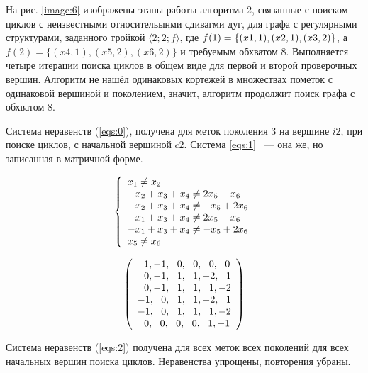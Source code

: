 \documentclass[14pt]{mmcs-article}
\begin{document}
На рис. \ref{image:6} изображены этапы работы алгоритма 2, связанные с поиском циклов с неизвестными относительынми сдивагми дуг, для графа с регулярными структурами, заданного тройкой $ \langle 2; 2; f\rangle $, где $ f(1) = \{ (x1, 1),\\ (x2, 1), (x3, 2) \} $, а $f(2) = \{ (x4, 1), (x5, 2), (x6, 2) \}$ и требуемым обхватом 8. Выполняется четыре итерации поиска циклов в общем виде для первой и второй проверочных вершин. Алгоритм не нашёл одинаковых кортежей в множествах пометок с одинаковой вершиной и поколением, значит, алгоритм продолжит поиск графа с обхватом 8.

Система неравенств (\ref{eqs:0}), получена для меток поколения $3$ на вершине $i2$, при поиске циклов, с начальной вершиной $c2$. Система \ref{eqs:1} ~--- она же, но записанная в матричной форме.

\begin{equation}
    \centering
    \left\{
        \begin{array}{ll}
            x_1 \neq x_2\\
            -x_2 + x_3 + x_4 \neq 2 x_5 - x_6\\
            -x_2 + x_3 + x_4 \neq -x_5 + 2 x_6\\
            -x_1 + x_3 + x_4 \neq 2 x_5 - x_6\\
            -x_1 + x_3 + x_4 \neq -x_5 + 2 x_6\\
            x_5 \neq x_6\\
        \end{array}
    \right.
    \label{eqs:0}
\end{equation}

\begin{equation}
    \centering
    \left(
        \begin{array}{ll}
            \ \ 1,-1,\ \ 0,\ \ 0,\ \ 0,\ \ 0\\
            \ \ 0,-1,\ \ 1,\ \ 1,-2,\ \ 1\\
            \ \ 0,-1,\ \ 1,\ \ 1,\ \ 1,-2\\
            -1,\ \ 0,\ \ 1,\ \ 1,-2,\ \ 1\\
            -1,\ \ 0,\ \ 1,\ \ 1,\ \ 1,-2\\
            \ \ 0,\ \ 0,\ \ 0,\ \ 0,\ \ 1,-1\\
        \end{array}
    \right)
    \label{eqs:1}
\end{equation}

Система неравенств (\ref{eqs:2}) получена для всех меток всех поколений для всех начальных вершин поиска циклов. Неравенства упрощены, повторения убраны.
\end{document}
